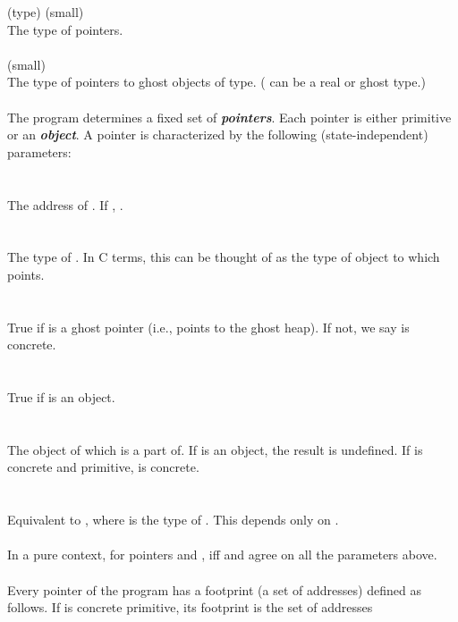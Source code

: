 \documentclass[preprint,nocopyrightspace]{sigplanconf}
\newcommand{\Def}[1]{\textit{\textbf{#1}}}
\begin{document}
{{\vcc{\object} (type) (small)\\
The type of pointers.
\\\\
 (small)\\
The type of pointers to ghost objects of type. ( can be a real or ghost type.)
\\\\
The program determines a fixed set of \Def{pointers}.  Each
pointer is either primitive or an \Def{object}. 
A pointer is characterized by the following (state-independent) parameters:
\\\\
\\
The address of . If , 
.
\\\\
\\
The type of . In C terms, this can be thought of as the type of
object to which  points.
\\\\
\\
True if  is a ghost pointer (i.e., points to the ghost
heap). If not, we say  is concrete. 
\\\\
\\
True if  is an object. 
\\\\
\\
The object of which  is a part of. If  is an object, the
result is undefined. If  is concrete and
primitive,  is concrete.
\\\\
\\
Equivalent to , where  is the type
of . This depends only on . 
\\\\
In a pure context, for pointers  and , 
iff  and  agree on all the parameters above.
\\\\
Every pointer of the program has a footprint (a set of addresses)
defined as follows.  If  is concrete primitive, its footprint
is the set of addresses
}}
\end{document}
